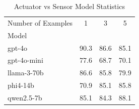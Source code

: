 \begin{table}[centering]
\caption{Actuator vs Sensor Model Statistics}
\label{tab:actuator_stats}
\begin{tabular}{lccc}
\toprule
Number of Examples & 1 & 3 & 5 \\
Model &  &  &  \\
\midrule
gpt-4o & 90.3 & 86.6 & 85.1 \\
gpt-4o-mini & 77.6 & 68.7 & 70.1 \\
llama-3-70b & 86.6 & 85.8 & 79.9 \\
phi4-14b & 70.9 & 85.1 & 85.8 \\
qwen2.5-7b & 85.1 & 84.3 & 88.1 \\
\bottomrule
\end{tabular}
\end{table}
